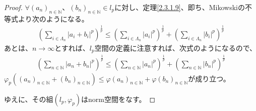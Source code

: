 \documentclass[dvipdfmx]{jsarticle}
\begin{document}
\begin{proof}
$\forall\left( a_{n} \right)_{n \in \mathbb{N}}、\left( b_{n} \right)_{n \in \mathbb{N}} \in l_{p}$に対し、定理\ref{2.3.1.9}、即ち、Mikowskiの不等式より次のようになる。
\begin{align*}
\left( \sum_{i \in \varLambda_{n}} \left| a_{i} + b_{i} \right|^{p} \right)^{\frac{1}{p}} \leq \left( \sum_{i \in \varLambda_{n}} \left| a_{i} \right|^{p} \right)^{\frac{1}{p}} + \left( \sum_{i \in \varLambda_{n}} \left| b_{i} \right|^{p} \right)^{\frac{1}{p}}
\end{align*}
あとは、$n \rightarrow \infty$とすれば、$l_{p}$空間の定義に注意すれば、次式のようになるので、
\begin{align*}
\left( \sum_{n \in \mathbb{N}} \left| a_{n} + b_{n} \right|^{p} \right)^{\frac{1}{p}} \leq \left( \sum_{n \in \mathbb{N}} \left| a_{n} \right|^{p} \right)^{\frac{1}{p}} + \left( \sum_{n \in \mathbb{N}} \left| b_{n} \right|^{p} \right)^{\frac{1}{p}}
\end{align*}
$\varphi_{p}\left( \left( a_{n} \right)_{n \in \mathbb{N}} + \left( b_{n} \right)_{n \in \mathbb{N}} \right) \leq \varphi\left( a_{n} \right)_{n \in \mathbb{N}} + \varphi\left( b_{n} \right)_{n \in \mathbb{N}}$が成り立つ。\par
ゆえに、その組$\left( l_{p},\varphi_{p} \right)$はnorm空間をなす。
\end{proof}
\end{document}
